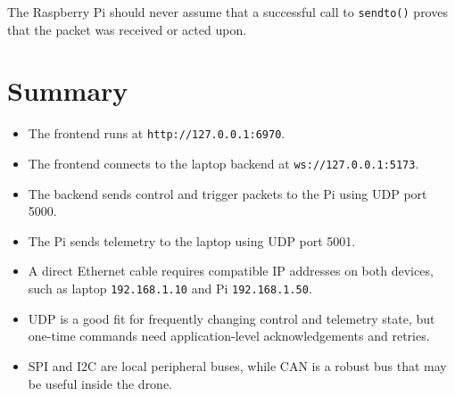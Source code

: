 \documentclass[11pt]{article}
\begin{document}
The Raspberry Pi should never assume that a successful call to
\texttt{sendto()} proves that the packet was received or acted upon.

\section{Summary}

\begin{itemize}[leftmargin=*]
    \item The frontend runs at \texttt{http://127.0.0.1:6970}.
    \item The frontend connects to the laptop backend at
          \texttt{ws://127.0.0.1:5173}.
    \item The backend sends control and trigger packets to the Pi using UDP
          port 5000.
    \item The Pi sends telemetry to the laptop using UDP port 5001.
    \item A direct Ethernet cable requires compatible IP addresses on both
          devices, such as laptop \texttt{192.168.1.10} and Pi
          \texttt{192.168.1.50}.
    \item UDP is a good fit for frequently changing control and telemetry
          state, but one-time commands need application-level acknowledgements
          and retries.
    \item SPI and I2C are local peripheral buses, while CAN is a robust bus
          that may be useful inside the drone.
\end{itemize}
\end{document}
